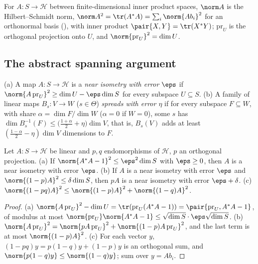 For $A\colon S\to\mathcal H$ between finite-dimensional inner product spaces, $\norm A$ is the
Hilbert--Schmidt norm, $\norm A^2=\tr(A^*A)=\sum_i\norm{Ab_i}^2$ for an orthonormal basis
(), with inner product $\pair{X,Y}=\tr(X^*Y)$; $\mathrm{pr}_U$ is the
orthogonal projection onto $U$, and $\norm{\mathrm{pr}_U}^2=\dim U$.

\subsection{The abstract spanning argument}\label{sp-moment:ss:abstract}

\begin{definition}\label{sp-moment:def:spread}
(a) A map $A\colon S\to\mathcal H$ is a \emph{near isometry with error $\eps$} if
$\norm{A\,\mathrm{pr}_U}^2\ge\dim U-\eps\dim S$ for every subspace $U\subseteq S$.
(b) A family of linear maps $B_s\colon V\to W$ ($s\in\Theta$) \emph{spreads with error $\eta$} if
for every subspace $F\subseteq W$, with share $\alpha=\dim F/\dim W$ ($\alpha=0$ if $W=0$), some
$s$ has $\dim B_s^{-1}(F)\le\bigl(\tfrac{1+\alpha}2+\eta\bigr)\dim V$, that is, $B_s(V)$ adds at
least $(\frac{1-\alpha}2-\eta)\dim V$ dimensions to $F$.
\end{definition}

\begin{lemma}
\label{sp-moment:lem:isometry}
Let $A\colon S\to\mathcal H$ be linear and $p,q$ endomorphisms of $\mathcal H$, $p$ an orthogonal projection.
(a) If $\norm{A^*A-1}^2\le\eps^2\dim S$ with $\eps\ge0$, then $A$ is a near isometry with error
$\eps$. (b) If $A$ is a near isometry with error $\eps$ and $\norm{(1-p)A}^2\le\delta\dim S$, then
$pA$ is a near isometry with error $\eps+\delta$. (c)
$\norm{(1-pq)A}^2\le\norm{(1-p)A}^2+\norm{(1-q)A}^2$.
\end{lemma}

\begin{proof}
(a) $\norm{A\,\mathrm{pr}_U}^2-\dim U=\tr(\mathrm{pr}_U(A^*A-1))=\pair{\mathrm{pr}_U,A^*A-1}$, of
modulus at most $\norm{\mathrm{pr}_U}\norm{A^*A-1}\le\sqrt{\dim S}\cdot\eps\sqrt{\dim S}$.
(b) $\norm{A\,\mathrm{pr}_U}^2=\norm{pA\,\mathrm{pr}_U}^2+\norm{(1-p)A\,\mathrm{pr}_U}^2$, and the
last term is at most $\norm{(1-p)A}^2$. (c) For each vector $y$, $(1-pq)y=p(1-q)y+(1-p)y$ is an
orthogonal sum, and $\norm{p(1-q)y}\le\norm{(1-q)y}$; sum over $y=Ab_i$.
\end{proof}


